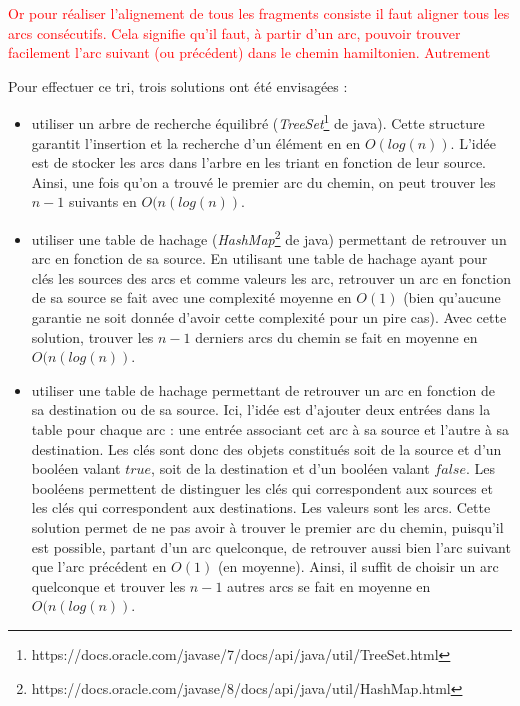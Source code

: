 \documentclass{article}
\begin{document}
\textcolor{red}{
Or pour réaliser l'alignement de tous les fragments consiste  il faut aligner tous les arcs consécutifs. Cela signifie qu'il faut, à partir d'un arc, pouvoir trouver facilement l'arc suivant (ou précédent) dans le chemin hamiltonien. Autrement}

Pour effectuer ce tri, trois solutions ont été envisagées :
\begin{itemize}
\item utiliser un arbre de recherche équilibré (\textit{TreeSet}\footnote{https://docs.oracle.com/javase/7/docs/api/java/util/TreeSet.html} de java). Cette structure garantit l'insertion et la recherche d'un élément en en $O(log(n))$. L'idée est de stocker les arcs dans l'arbre en les triant en fonction de leur source. Ainsi, une fois qu'on a trouvé le premier arc du chemin, on peut trouver les $n-1$ suivants en $O(n(log(n))$.

\item utiliser une table de hachage (\textit{HashMap}\footnote{\label{note1}https://docs.oracle.com/javase/8/docs/api/java/util/HashMap.html} de java) permettant de retrouver un arc en fonction de sa source. En utilisant une table de hachage ayant pour clés les sources des arcs et comme valeurs les arc, retrouver un arc en fonction de sa source se fait avec une complexité moyenne en $O(1)$ (bien qu'aucune garantie ne soit donnée d'avoir cette complexité pour un pire cas). Avec cette solution, trouver les $n-1$ derniers arcs du chemin se fait en moyenne en $O(n(log(n))$.

\item utiliser une table de hachage permettant de retrouver un arc en fonction de sa destination ou de sa source. Ici, l'idée est d'ajouter deux entrées dans la table pour chaque arc : une entrée associant cet arc à sa source et l'autre à sa destination. Les clés sont donc des objets constitués soit de la source et d'un booléen valant $true$, soit de la destination et d'un booléen valant $false$. Les booléens permettent de distinguer les clés qui correspondent aux sources et les clés qui correspondent aux destinations. Les valeurs sont les arcs. Cette solution permet de ne pas avoir à trouver le premier arc du chemin, puisqu'il est possible, partant d'un arc quelconque, de retrouver aussi bien l'arc suivant que l'arc précédent en $O(1)$ (en moyenne). Ainsi, il suffit de choisir un arc quelconque et trouver les $n-1$ autres arcs se fait en moyenne en $O(n(log(n))$.
\end{itemize}
\end{document}
